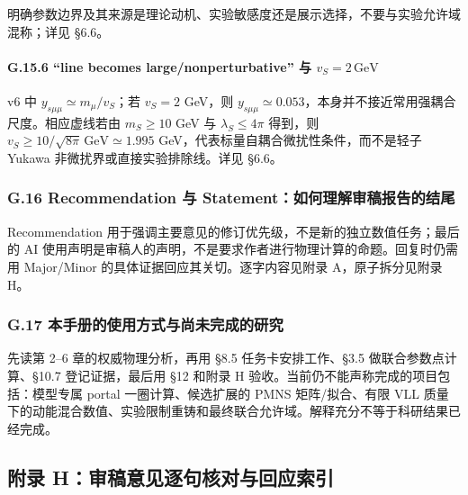 \documentclass[
]{article}
\begin{document}
明确参数边界及其来源是理论动机、实验敏感度还是展示选择，不要与实验允许域混称；详见
§6.6。

\paragraph{\texorpdfstring{G.15.6 ``line becomes large/nonperturbative''
与
\(v_S=2\,\mathrm{GeV}\)}{G.15.6 ``line becomes large/nonperturbative'' 与 v\_S=2\textbackslash,\textbackslash mathrm\{GeV\}}}\label{g.15.6-line-becomes-largenonperturbative-ux4e0e-v_s2mathrmgev}

v6 中 \(y_{s\mu\mu}\simeq m_\mu/v_S\)；若 \(v_S=2\) GeV，则
\(y_{s\mu\mu}\simeq0.053\)，本身并不接近常用强耦合尺度。相应虚线若由
\(m_S\geq10\) GeV 与 \(\lambda_S\leq4\pi\) 得到，则
\(v_S\geq10/\sqrt{8\pi}\,\mathrm{GeV}\simeq1.995\)
GeV，代表标量自耦合微扰性条件，而不是轻子 Yukawa
非微扰界或直接实验排除线。详见 §6.6。

\subsubsection{G.16 Recommendation 与
Statement：如何理解审稿报告的结尾}\label{g.16-recommendation-ux4e0e-statementux5982ux4f55ux7406ux89e3ux5ba1ux7a3fux62a5ux544aux7684ux7ed3ux5c3e}

Recommendation
用于强调主要意见的修订优先级，不是新的独立数值任务；最后的 AI
使用声明是审稿人的声明，不是要求作者进行物理计算的命题。回复时仍需用
Major/Minor 的具体证据回应其关切。逐字内容见附录 A，原子拆分见附录 H。

\subsubsection{G.17
本手册的使用方式与尚未完成的研究}\label{g.17-ux672cux624bux518cux7684ux4f7fux7528ux65b9ux5f0fux4e0eux5c1aux672aux5b8cux6210ux7684ux7814ux7a76}

先读第 2--6 章的权威物理分析，再用 §8.5 任务卡安排工作、§3.5
做联合参数点计算、§10.7 登记证据，最后用 §12 和附录 H
验收。当前仍不能声称完成的项目包括：模型专属 portal 一圈计算、候选扩展的
PMNS 矩阵/拟合、有限 VLL
质量下的动能混合数值、实验限制重铸和最终联合允许域。解释充分不等于科研结果已经完成。

\subsection{附录
H：审稿意见逐句核对与回应索引}\label{ux9644ux5f55-hux5ba1ux7a3fux610fux89c1ux9010ux53e5ux6838ux5bf9ux4e0eux56deux5e94ux7d22ux5f15}
\end{document}
